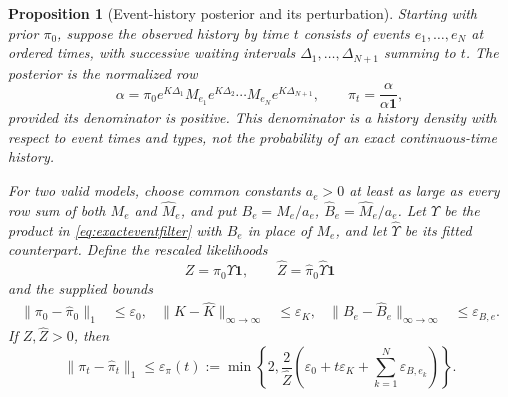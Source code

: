 \documentclass[11pt]{article}
\theoremstyle{plain}
\newtheorem{proposition}[theorem]{Proposition}
\theoremstyle{definition}
\theoremstyle{remark}
\newcommand{\norm}[1]{\lVert#1\rVert}
\begin{document}
\begin{proposition}[Event-history posterior and its perturbation]
\label{prop:eventfilter}
Starting with prior \(\pi_0\), suppose the observed history by time
\(t\) consists of events \(e_1,\ldots,e_N\) at ordered times, with
successive waiting intervals \(\Delta_1,\ldots,\Delta_{N+1}\) summing
to \(t\). The posterior is the normalized row
\begin{equation}\label{eq:exacteventfilter}
 \alpha=\pi_0e^{K\Delta_1}M_{e_1}e^{K\Delta_2}
                 \cdots M_{e_N}e^{K\Delta_{N+1}},\qquad
 \pi_t=\frac{\alpha}{\alpha\mathbf1},
\end{equation}
provided its denominator is positive. This denominator is a history
density with respect to event times and types, not the probability of
an exact continuous-time history.

For two valid models, choose common constants \(a_e>0\) at least as
large as every row sum of both \(M_e\) and \(\widehat M_e\), and put
\(B_e=M_e/a_e\), \(\widehat B_e=\widehat M_e/a_e\).
Let \(\Upsilon\) be the product in \eqref{eq:exacteventfilter} with
\(B_e\) in place of \(M_e\), and let \(\widehat \Upsilon\) be its fitted
counterpart. Define the rescaled likelihoods
\[
 Z=\pi_0\Upsilon\mathbf1,\qquad
 \widehat Z=\widehat\pi_0\widehat \Upsilon\mathbf1
\]
and the supplied bounds
\begin{align*}
 \norm{\pi_0-\widehat\pi_0}_1&\le\varepsilon_0,&
 \norm{K-\widehat K}_{\infty\to\infty}&\le\varepsilon_K,&
 \norm{B_e-\widehat B_e}_{\infty\to\infty}&\le\varepsilon_{B,e}.
\end{align*}
If \(Z,\widehat Z>0\), then
\begin{equation}\label{eq:filtererror}
 \norm{\pi_t-\widehat\pi_t}_1
 \le\varepsilon_\pi(t):=
 \min\left\{2,\frac{2}{\widehat Z}
       \left(\varepsilon_0+t\varepsilon_K+
             \sum_{k=1}^N\varepsilon_{B,e_k}\right)\right\}.
\end{equation}
\end{proposition}
\end{document}
